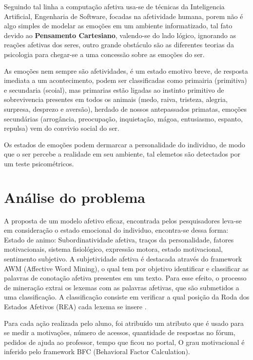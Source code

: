 \documentclass[12pt,a4paper,twocolumn]{article}
\begin{document}
Seguindo tal linha a computação afetiva usa-se de técnicas da Inteligencia Artificial, Engenharia de Software, focadas na afetividade humana, porem não é algo simples de modelar as emoções em um ambiente informatizado, tal fato devido ao \textbf{Pensamento Cartesiano}, valendo-se do lado lógico, ignorando as reações afetivas dos seres, outro grande obstáculo são as diferentes teorias da psicologia para chegar-se a uma concessão sobre as emoções do ser.

As emoções nem sempre são afetividades, é um estado emotivo breve, de resposta imediata a um acontecimento, podem ser classificadas como primairia (primitiva) e secundaria (scoial), mas primarias estão ligadas ao instinto primitivo de sobrevivencia presentes em todos os animais (medo, raiva, tristeza, alegria, surpresa, desprezo e aversão), herdado de nossos antepassados primatas, emoções secundárias (arrogância, preocupação, inquietação, mágoa, entusiasmo, espanto, repulsa) vem do convivio social do ser.

Os estados de emoções podem dermarcar a personalidade do individuo, de modo que o ser percebe a realidade em seu ambiente, tal elemetos são detectados por um teste psicométricos.



\section{Análise do problema}
A proposta de um modelo afetivo eficaz, encontrada pelos pesquisadores leva-se em consideração o estado emocional do individuo, encontra-se dessa forma:
Estado de animo: Subordinatividade afetiva, traços da personalidade, fatores motivacionais, sistema fisiológico, expressão motora, estado motivacional, sentimento subjetivo.
A subjetividade afetiva é destacada através do framework AWM (Affective Word Mining), o qual tem por objetivo identificar e classificar as palavras de conotação afetiva presentes em um texto. Para esse efeito, o processo de mineração extrai os lexemas com as palavras afetivas, que são submetidos a uma classificação. A classificação consiste em verificar a qual posição da Roda dos Estados Afetivos (REA) cada lexema se insere .

Para cada ação realizada pelo aluno, foi atribuído um atributo que é usado para se medir a motivações, número de acessos, quantidade de respostas no fórum, pedidos de ajuda ao professor, tempo que ficou no portal, O grau motivacional é inferido pelo framework BFC (Behavioral Factor Calculation).
\end{document}

